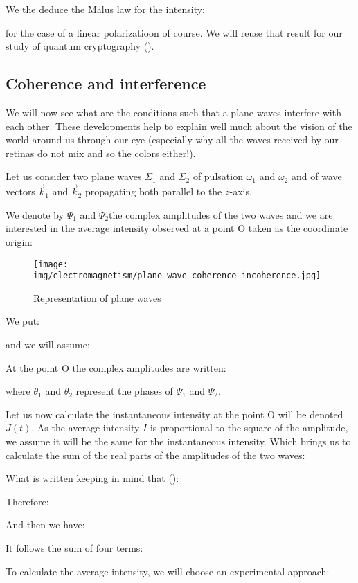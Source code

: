 	We the deduce the Malus law for the intensity\label{malus law}:
	
	for the case of a linear polarizatioon of course. We will reuse that result for our study of quantum cryptography ().
	
	
	\subsection{Coherence and interference}
	We will now see what are the conditions such that a plane waves interfere with each other. These developments help to explain  well much about the vision of the world around us through our eye (especially why all the waves received by our retinas do not mix and so the colors either!).

	Let us consider two plane waves $\Sigma_1$ and $\Sigma_2$ of pulsation $\omega_1$ and $\omega_2$ and of wave vectors $\vec{k}_1$ and $\vec{k}_2$ propagating both parallel to the $z$-axis.

	We denote by $\Psi_1$ and $\Psi_2$the complex amplitudes of the two waves and we are interested in the average intensity observed at a point O taken as the coordinate origin:
	\begin{figure}[H]
		\centering
		\texttt{[image: img/electromagnetism/plane\_wave\_coherence\_incoherence.jpg]}
		\caption{Representation of plane waves}
	\end{figure}
	We put:
	
	and we will assume:
	
	At the point O the complex amplitudes are written:
	
	where $\theta_1$ and $\theta_2$ represent the phases of $\Psi_1$ and $\Psi_2$.
	
	Let us now calculate the instantaneous intensity at the point O will be denoted $J(t)$. As the average intensity $I$ is proportional to the square of the amplitude, we assume it will be the same for the instantaneous intensity. Which brings us to calculate the sum of the real parts of the amplitudes of the two waves:
	
	What is written keeping in mind that ():
	
	Therefore:
	
	And then we have:
	
	It follows the sum of four terms:
	
	To calculate the average intensity, we will choose an experimental approach:

